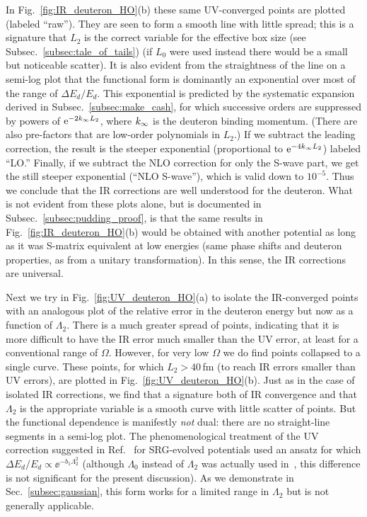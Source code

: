 	In Fig.~\ref{fig:IR_deuteron_HO}(b) these same UV-converged points are
	plotted (labeled ``raw'').  They are seen to form a smooth line
	with little spread; this is a signature that $L_2$ is the correct
	variable for the effective box size (see Subsec.~\ref{subsec:tale_of_tails})
	(if $L_0$ were used instead there would be a small but noticeable scatter).
	It is
	also evident from the straightness of the line on a semi-log plot that the
	functional form is dominantly an exponential over most of the range of
	$\Delta E_d/E_d$.  This exponential is predicted by the systematic
	expansion derived	in Subsec.~\ref{subsec:make_cash}, for
	which successive orders are suppressed by powers of $\mathrm{e}^{-2k_{\infty} L_2}$,
	where $k_{\infty}$ is the deuteron binding momentum.  (There are also
	pre-factors that are low-order polynomials in $L_2$.)  If we subtract
	the leading correction, the result is the steeper exponential
	(proportional to $\mathrm{e}^{-4k_{\infty} L_2}$) labeled ``LO.''  Finally, if we
	subtract the NLO correction for only the S-wave part, we get the still
	steeper
	exponential (``NLO S-wave''), which is valid down to $10^{-5}$.  Thus we
	conclude that the IR corrections are well understood for the deuteron.
	What is	not evident from these plots alone, but is documented in
	Subsec.~\ref{subsec:pudding_proof}, is that the same results in
	Fig.~\ref{fig:IR_deuteron_HO}(b) would be obtained with another potential as
	long as it was S-matrix equivalent at low energies (same phase shifts and
	deuteron properties, as from a unitary transformation).  In this sense, the IR
	corrections are universal.

	Next we try in Fig.~\ref{fig:UV_deuteron_HO}(a) to isolate the
	IR-converged points with an analogous plot of the relative error in
	the deuteron energy but now as a function of $\Lambda_2$. There is a
	much greater spread of points, indicating that it is more difficult to
	have the IR error much smaller than the UV error, at least for a
	conventional range of $\Omega$.  However, for very low $\Omega$ we do
	find points collapsed to a single curve.  These points, for which $L_2
	> 40\,$fm (to reach IR errors smaller than UV errors), are plotted in
	Fig.~\ref{fig:UV_deuteron_HO}(b).  Just as in the case of isolated
	IR corrections, we find that a signature both of IR convergence
	and that $\Lambda_2$ is the appropriate variable is a smooth curve
	with little scatter of points.  But the functional dependence is
	manifestly \emph{not} dual: there are no straight-line segments in a
	semi-log plot.  The phenomenological treatment of the UV correction
	suggested in Ref.~\cite{Furnstahl:2012qg} for SRG-evolved potentials
	used an ansatz for which $\Delta E_d/E_d \propto \ee^{-b_1\Lambda_2^2}$
	(although $\Lambda_0$ instead of $\Lambda_2$ was
	actually used in~\cite{Furnstahl:2012qg}, this difference is not
	significant for the present discussion).  As we demonstrate in
	Sec.~\ref{subsec:gaussian}, this form works for a limited range in
	$\Lambda_2$ but is not generally applicable.


